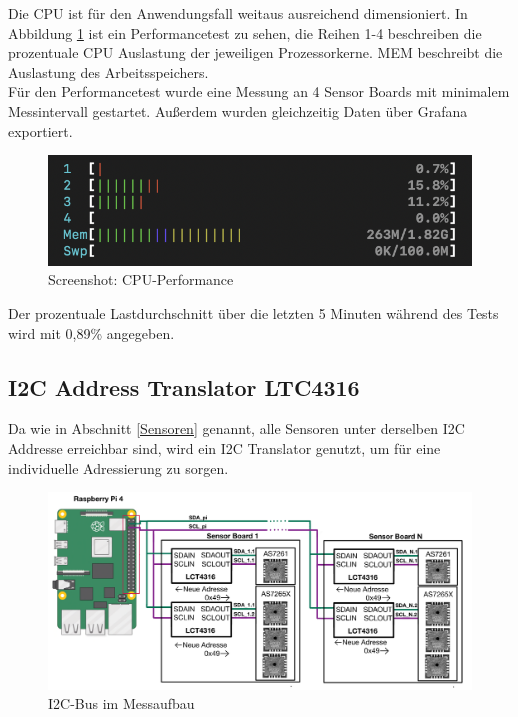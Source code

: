 Die CPU ist für den Anwendungsfall weitaus ausreichend dimensioniert.
In Abbildung \ref{fig:CPU-Performance} ist ein Performancetest zu sehen, die Reihen 1-4 beschreiben die prozentuale CPU Auslastung der jeweiligen Prozessorkerne.
MEM beschreibt die Auslastung des Arbeitsspeichers.\\
Für den Performancetest wurde eine Messung an 4 Sensor Boards mit minimalem Messintervall gestartet.
Außerdem wurden gleichzeitig Daten über Grafana exportiert.\\
\begin{figure}[H]
  \centering
  \includegraphics[width=0.7\linewidth]{img/CPU-Performance.png}
  \caption{Screenshot: CPU-Performance}
  \label{fig:CPU-Performance}
\end{figure}
\noindent Der prozentuale Lastdurchschnitt über die letzten 5 Minuten während des Tests wird mit 0,89\% angegeben.

\subsection{I2C Address Translator LTC4316}\label{I2C-Translator}
Da wie in Abschnitt \ref{Sensoren} genannt, alle Sensoren unter derselben I2C Addresse erreichbar sind, wird ein I2C Translator genutzt, um für eine individuelle Adressierung zu sorgen.\\

\begin{figure}[H]
  \centering
 \includegraphics[width=1\linewidth]{img/Adress-Translation}
  \caption{I2C-Bus im Messaufbau \cite{raspberrypi_fundation}}
    \label{fig:adress-translation}
\end{figure}

